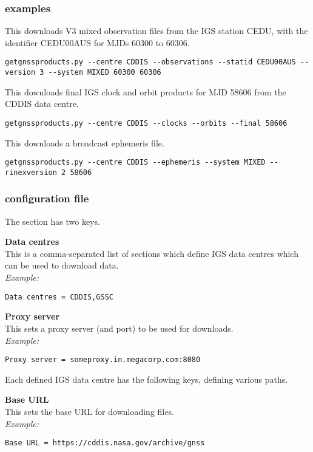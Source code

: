 \subsubsection{examples}

This downloads V3 mixed observation files from the IGS station CEDU, with the identifier CEDU00AUS
for MJDs 60300  to 60306.\\
\begin{lstlisting}
getgnssproducts.py --centre CDDIS --observations --statid CEDU00AUS --version 3 --system MIXED 60300 60306
\end{lstlisting}

This downloads final IGS clock and orbit products for MJD 58606 from the CDDIS data centre.\\
\begin{lstlisting}
getgnssproducts.py --centre CDDIS --clocks --orbits --final 58606
\end{lstlisting}

This downloads a  broadcast ephemeris file.\\
\begin{lstlisting}
getgnssproducts.py --centre CDDIS --ephemeris --system MIXED --rinexversion 2 58606
\end{lstlisting}

\subsubsection{configuration file}

The \cc{[Main]} section has two keys.

{\bfseries Data centres}\\
This is a comma-separated list of sections which define IGS data centres which can be used to download data.\\
\textit{Example:}
\begin{lstlisting}
Data centres = CDDIS,GSSC
\end{lstlisting}

{\bfseries Proxy server}\\
This sets a proxy server (and port) to be used for downloads.\\
\textit{Example:}
\begin{lstlisting}
Proxy server = someproxy.in.megacorp.com:8080
\end{lstlisting}

Each defined IGS data centre has the following keys, defining various paths.

{\bfseries Base URL}\\
This sets the base URL for downloading files.\\
\textit{Example:}
\begin{lstlisting}
Base URL = https://cddis.nasa.gov/archive/gnss
\end{lstlisting}

